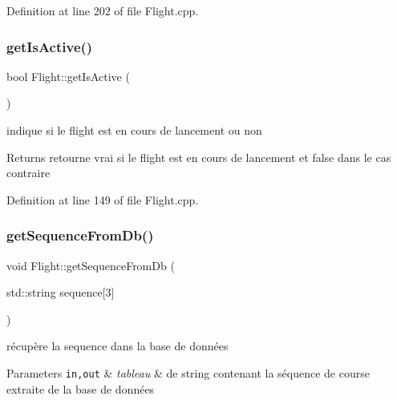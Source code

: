 Definition at line 202 of file Flight.\+cpp.

\mbox{\label{class_flight_a905f20ea23734db3fe6c8d51b6e81bfe}} 
\subsubsection{\texorpdfstring{get\+Is\+Active()}{getIsActive()}}
{\footnotesize\ttfamily bool Flight\+::get\+Is\+Active (\begin{DoxyParamCaption}{ }\end{DoxyParamCaption})}



indique si le flight est en cours de lancement ou non 

\begin{DoxyReturn}{Returns}
retourne vrai si le flight est en cours de lancement et false dans le cas contraire 
\end{DoxyReturn}


Definition at line 149 of file Flight.\+cpp.

\mbox{\label{class_flight_a6c813df7df89bc3bc901387bb0854102}} 
\subsubsection{\texorpdfstring{get\+Sequence\+From\+Db()}{getSequenceFromDb()}}
{\footnotesize\ttfamily void Flight\+::get\+Sequence\+From\+Db (\begin{DoxyParamCaption}\item[{std\+::string}]{sequence\mbox{[}3\mbox{]} }\end{DoxyParamCaption})}



récupère la sequence dans la base de données 


\begin{DoxyItemize}
\item 
\begin{DoxyParams}[1]{Parameters}
\mbox{\tt in,out}  & {\em tableau} & de string contenant la séquence de course extraite de la base de données \\
\hline
\end{DoxyParams}

\end{DoxyItemize}

